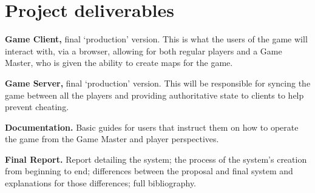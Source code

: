 \documentclass[11pt,fleqn,twoside]{article}
\begin{document}
\section{Project deliverables}
\begin{description}
	\item{\textbf{Game Client,} final `production' version.} This is what the users of the game will interact with, via a browser, allowing for both regular players and a Game Master, who is given the ability to create maps for the game.

	\item{\textbf{Game Server,} final `production' version.} This will be responsible for syncing the game between all the players and providing authoritative state to clients to help prevent cheating.

	\item{\textbf{Documentation.}} Basic guides for users that instruct them on how to operate the game from the Game Master and player perspectives.

	\item{\textbf{Final Report.}} Report detailing the system; the process of the system's creation from beginning to end; differences between the proposal and final system and explanations for those differences; full bibliography.
\end{description}


%
%

\end{document}
